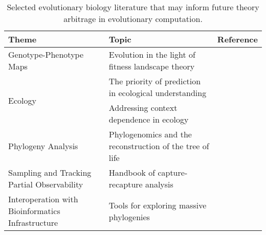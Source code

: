 \begin{table*}
\centering
\caption{Selected evolutionary biology literature that may inform future theory arbitrage in evolutionary computation.}
\label{tab:arbitrage-opportunities}
\begin{tabular}{@{}p{3.2cm}p{5.8cm}p{6cm}@{}}
\toprule
\textbf{Theme} & \textbf{Topic} & \textbf{Reference} \\
\midrule
Genotype-Phenotype Maps & Evolution in the light of fitness landscape theory & \citep{fragata2019evolution} \\
\midrule
\multirow{2}{*}{Ecology} & The priority of prediction in ecological understanding & \citep{houlahan2016priority} \\
 & Addressing context dependence in ecology & \citep{catford2022addressing} \\
\midrule
Phylogeny Analysis & Phylogenomics and the reconstruction of the tree of life & \citep{delsuc2005phylogenomics,abaza2020what} \\
\midrule
Sampling and Tracking Partial Observability & Handbook of capture-recapture analysis & \citep{amstrup2010handbook,burnham1979robust} \\
\midrule
Interoperation with Bioinformatics Infrastructure & Tools for exploring massive phylogenies & \citep{sanderson2022taxonium,moshiri2025compacttree,moshiri2020treeswift} \\
\bottomrule
\end{tabular}
\end{table*}
